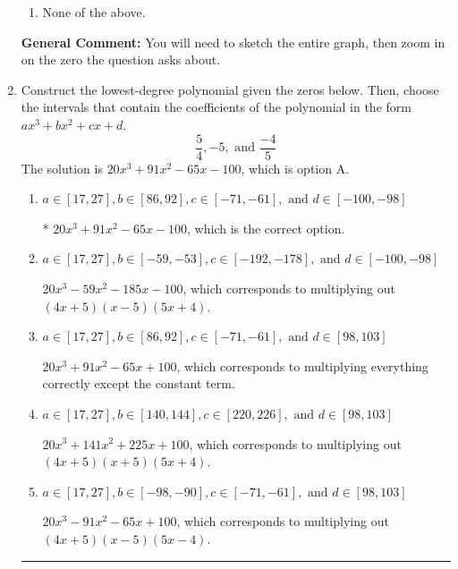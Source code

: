 \documentclass{extbook}[14pt]
\newcommand{\litem}[1]{\item #1

\rule{\textwidth}{0.4pt}}
\begin{document}
\begin{enumerate}
{\begin{enumerate}[label=\Alph*.]
\item None of the above.\end{enumerate}
\textbf{General Comment:} You will need to sketch the entire graph, then zoom in on the zero the question asks about.
}
\litem{
Construct the lowest-degree polynomial given the zeros below. Then, choose the intervals that contain the coefficients of the polynomial in the form $ax^3+bx^2+cx+d$.
\[ \frac{5}{4}, -5, \text{ and } \frac{-4}{5} \]The solution is \( 20x^{3} +91 x^{2} -65 x -100 \), which is option A.\begin{enumerate}[label=\Alph*.]
\item \( a \in [17, 27], b \in [86, 92], c \in [-71, -61], \text{ and } d \in [-100, -98] \)

* $20x^{3} +91 x^{2} -65 x -100$, which is the correct option.
\item \( a \in [17, 27], b \in [-59, -53], c \in [-192, -178], \text{ and } d \in [-100, -98] \)

$20x^{3} -59 x^{2} -185 x -100$, which corresponds to multiplying out $(4x + 5)(x -5)(5x + 4)$.
\item \( a \in [17, 27], b \in [86, 92], c \in [-71, -61], \text{ and } d \in [98, 103] \)

$20x^{3} +91 x^{2} -65 x + 100$, which corresponds to multiplying everything correctly except the constant term.
\item \( a \in [17, 27], b \in [140, 144], c \in [220, 226], \text{ and } d \in [98, 103] \)

$20x^{3} +141 x^{2} +225 x + 100$, which corresponds to multiplying out $(4x + 5)(x + 5)(5x + 4)$.
\item \( a \in [17, 27], b \in [-98, -90], c \in [-71, -61], \text{ and } d \in [98, 103] \)

$20x^{3} -91 x^{2} -65 x + 100$, which corresponds to multiplying out $(4x + 5)(x -5)(5x -4)$.
\end{enumerate}

}
\end{enumerate}
\end{document}
